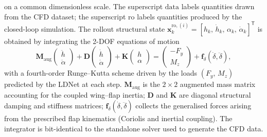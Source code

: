 on a common dimensionless scale. The superscript $\mathrm{data}$ labels quantities drawn
from the CFD dataset; the superscript $\mathrm{ro}$ labels quantities produced by the
closed-loop simulation. The rollout structural state
$\mathbf{x}_k^{\mathrm{ro},(i)} = [h_k,\,\dot{h}_k,\,\alpha_k,\,\dot{\alpha}_k]^\mathsf{T}$
is obtained by integrating the 2-DOF equations of motion
\begin{equation}
\mathbf{M}_\mathrm{aug}
\begin{pmatrix}\ddot{h}\\\ddot{\alpha}\end{pmatrix}
+ \mathbf{D}
\begin{pmatrix}\dot{h}\\\dot{\alpha}\end{pmatrix}
+ \mathbf{K}
\begin{pmatrix}h\\\alpha\end{pmatrix}
= \begin{pmatrix}-F_y\\M_z\end{pmatrix} + \mathbf{f}_\delta(\dot{\delta},\ddot{\delta}),
\label{eq:struct_ode}
\end{equation}
with a fourth-order Runge--Kutta scheme driven by the loads $(F_y,\,M_z)$ predicted by the
LDNet at each step. $\mathbf{M}_\mathrm{aug}$ is the $2\times 2$ augmented mass matrix
accounting for the coupled wing--flap inertia; $\mathbf{D}$ and $\mathbf{K}$ are diagonal
structural damping and stiffness matrices; $\mathbf{f}_\delta(\dot{\delta},\ddot{\delta})$
collects the generalised forces arising from the prescribed flap kinematics (Coriolis and
inertial coupling). The integrator is bit-identical to the standalone solver used to
generate the CFD data.

